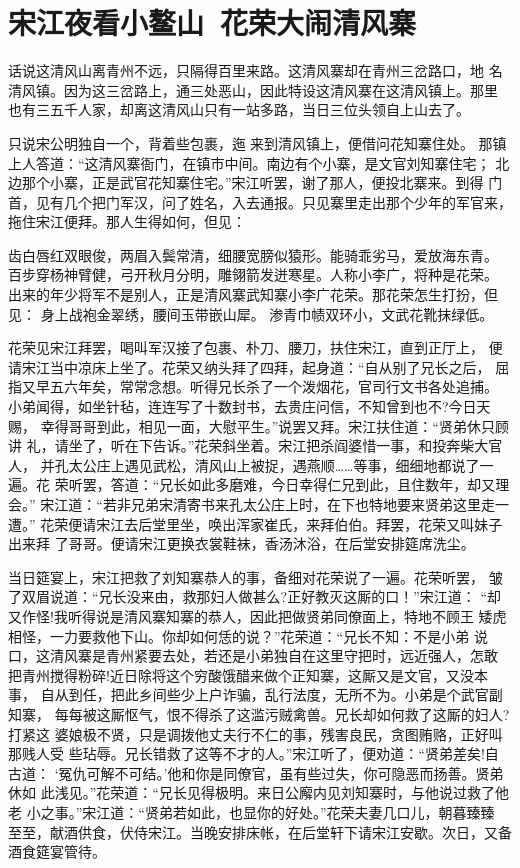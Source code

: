 \chapter{宋江夜看小鳌山~花荣大闹清风寨}

话说这清风山离青州不远，只隔得百里来路。这清风寨却在青州三岔路口，地
名清风镇。因为这三岔路上，通三处恶山，因此特设这清风寨在这清风镇上。那里
也有三五千人家，却离这清风山只有一站多路，当日三位头领自上山去了。

只说宋公明独自一个，背着些包裹，迤来到清风镇上，便借问花知寨住处。
那镇上人答道：“这清风寨衙门，在镇市中间。南边有个小寨，是文官刘知寨住宅；
北边那个小寨，正是武官花知寨住宅。”宋江听罢，谢了那人，便投北寨来。到得
门首，见有几个把门军汉，问了姓名，入去通报。只见寨里走出那个少年的军官来，
拖住宋江便拜。那人生得如何，但见：

齿白唇红双眼俊，两眉入鬓常清，细腰宽膀似猿形。能骑乖劣马，爱放海东青。
百步穿杨神臂健，弓开秋月分明，雕翎箭发迸寒星。人称小李广，将种是花荣。
出来的年少将军不是别人，正是清风寨武知寨小李广花荣。那花荣怎生打扮，但见：
身上战袍金翠绣，腰间玉带嵌山犀。
渗青巾帻双环小，文武花靴抹绿低。

花荣见宋江拜罢，喝叫军汉接了包裹、朴刀、腰刀，扶住宋江，直到正厅上，
便请宋江当中凉床上坐了。花荣又纳头拜了四拜，起身道：“自从别了兄长之后，
屈指又早五六年矣，常常念想。听得兄长杀了一个泼烟花，官司行文书各处追捕。
小弟闻得，如坐针毡，连连写了十数封书，去贵庄问信，不知曾到也不?今日天赐，
幸得哥哥到此，相见一面，大慰平生。”说罢又拜。宋江扶住道：“贤弟休只顾讲
礼，请坐了，听在下告诉。”花荣斜坐着。宋江把杀阎婆惜一事，和投奔柴大官人，
并孔太公庄上遇见武松，清风山上被捉，遇燕顺……等事，细细地都说了一遍。花
荣听罢，答道：“兄长如此多磨难，今日幸得仁兄到此，且住数年，却又理会。”
宋江道：“若非兄弟宋清寄书来孔太公庄上时，在下也特地要来贤弟这里走一遭。”
花荣便请宋江去后堂里坐，唤出浑家崔氏，来拜伯伯。拜罢，花荣又叫妹子出来拜
了哥哥。便请宋江更换衣裳鞋袜，香汤沐浴，在后堂安排筵席洗尘。

当日筵宴上，宋江把救了刘知寨恭人的事，备细对花荣说了一遍。花荣听罢，
皱了双眉说道：“兄长没来由，救那妇人做甚么?正好教灭这厮的口！”宋江道：
“却又作怪!我听得说是清风寨知寨的恭人，因此把做贤弟同僚面上，特地不顾王
矮虎相怪，一力要救他下山。你却如何恁的说？”花荣道：“兄长不知：不是小弟
说口，这清风寨是青州紧要去处，若还是小弟独自在这里守把时，远近强人，怎敢
把青州搅得粉碎!近日除将这个穷酸饿醋来做个正知寨，这厮又是文官，又没本事，
自从到任，把此乡间些少上户诈骗，乱行法度，无所不为。小弟是个武官副知寨，
每每被这厮怄气，恨不得杀了这滥污贼禽兽。兄长却如何救了这厮的妇人?打紧这
婆娘极不贤，只是调拨他丈夫行不仁的事，残害良民，贪图贿赂，正好叫那贱人受
些玷辱。兄长错救了这等不才的人。”宋江听了，便劝道：“贤弟差矣!自古道：
‘冤仇可解不可结。’他和你是同僚官，虽有些过失，你可隐恶而扬善。贤弟休如
此浅见。”花荣道：“兄长见得极明。来日公廨内见刘知寨时，与他说过救了他老
小之事。”宋江道：“贤弟若如此，也显你的好处。”花荣夫妻几口儿，朝暮臻臻
至至，献酒供食，伏侍宋江。当晚安排床帐，在后堂轩下请宋江安歇。次日，又备
酒食筵宴管待。

